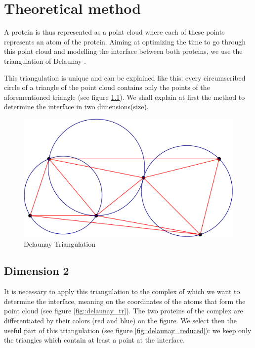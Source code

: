 \chapter{Theoretical method}
A protein is thus represented as a point cloud where each of these points
represents an atom of the protein. Aiming at optimizing the time to go through
this point cloud and modelling the interface between both
 proteins, we use the triangulation of Delaunay \cite{Triangulation}.

This triangulation is unique and can be explained like this:
every circumscribed circle of a triangle of the point cloud contains only the
points of the aforementioned triangle (see figure \ref{fig::explication_delaunay}).
We shall explain at first the method to determine the interface in two dimensions(size).

\begin{figure}[ht]
\centering
  \includegraphics[width=\textwidth]{figures/explication_delaunay.png}
  \caption{Delaunay Triangulation}
  \label{fig::explication_delaunay}
\end{figure}

\section{Dimension 2}

It is necessary to apply this triangulation to the complex of which
 we want to determine the interface, meaning on the coordinates of the atoms that
 form the point cloud (see figure \ref{fig::delaunay_tr}).
  The two proteins of the complex are differentiated by their colors (red and blue)
   on the figure.
   We select then the useful part of this triangulation (see figure \ref{fig::delaunay_reduced}):
    we keep only the triangles which contain at least a point at the interface.

